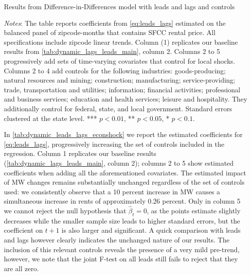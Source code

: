 \begin{table}[h!]
    \caption{Results from Difference-in-Differences model with leads and lags and controls}
    \label{tab:dynamic_leads_lags_econshock}
    \centering
    \resizebox{0.9\textwidth}{!}{
	    \vspace{0pt}
	    }
    \begin{minipage}{0.95\textwidth} \footnotesize
		\vspace{3mm} 
		\textit{Notes}: The table reports coefficients from \autoref{eq:leads_lags} estimated on the 
		balanced panel of zipcode-months that contains SFCC rental price. All specifications include 
		zipcode linear trends. Column (1) replicates our baseline results from 
		\autoref{tab:dynamic_lags_leads_main}, column 2. Columns 2 to 5 progressively add sets of 
		time-varying covariates that control for local shocks. Columns 2 to 4 add controls for the 
		following industries: goods-producing; natural resources and mining; construction; 
		manufacturing; service-providing; trade, transportation and utilities; information; 
		financial activities; professional and business services; education and health services; 
		leisure and hospitality. They additionally control for federal, state, and local government. 
		Standard errors clustered at the state level. *** $p < 0.01$, ** $p < 0.05$, * $p < 0.1$.
	\end{minipage}
\end{table}

In \autoref{tab:dynamic_leads_lags_econshock} we report the estimated coefficients for 
\autoref{eq:leads_lags}, progressively increasing the set of controls included in the regression. 
Column 1 replicates our baseline results (\autoref{tab:dynamic_lags_leads_main}, column 2); columns 
2 to 5 show estimated coefficients when adding all the aforementioned covariates. The estimated 
impact of MW changes remains substantially unchanged regardless of the set of controls used: we 
consistently observe that a 10 percent increase in MW causes a simultaneous increase in rents of 
approximately 0.26 percent. Only in column 5 we cannot reject the null hypothesis that 
$\hat{\beta}_{t} = 0$, as the points estimate slightly decreases while the smaller sample size 
leads to higher standard errors, but the coefficient on $t+1$ is also larger and significant. A 
quick comparison with leads and lags however clearly indicates the unchanged nature of our results. 
The inclusion of this relevant controls reveals the presence of a very mild pre-trend, however, we 
note that the joint F-test on all leads still fails to reject that they are all zero.   



